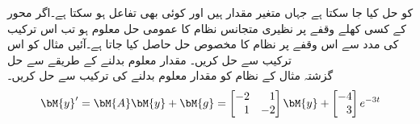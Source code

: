 کو حل کیا جا سکتا ہے جہاں  متغیر مقدار ہیں اور  کوئی بھی تفاعل ہو سکتا ہے۔اگر  محور کے کسی کھلے وقفے  پر  نظیری متجانس نظام کا عمومی حل  معلوم ہو تب اس ترکیب کی مدد سے اس وقفے پر نظام  کا مخصوص حل  حاصل کیا جاتا ہے۔آئیں مثال  کو اس ترکیب سے حل کریں۔
\quad مقدار معلوم بدلنے کے طریقے سے حل\\
گزشتہ مثال کے نظام  کو مقدار معلوم بدلنے کی ترکیب سے حل کریں۔
\begin{align}
\bM{y}'=\bM{A}\bM{y}+\bM{g}=\begin{bmatrix*}[r] -2&1\\1&-2 \end{bmatrix*} \bM{y}+\begin{bmatrix*}[r] -4\\3 \end{bmatrix*} e^{-3t}
\end{align}


